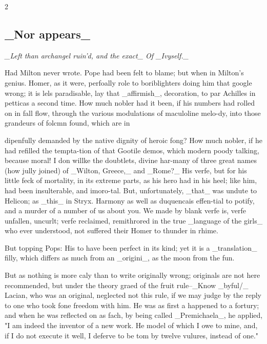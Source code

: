 \documentclass[10pt]{article}
\begin{document}
\begin{multicols}{2}
\subsection*{\_Nor appears\_}
\begin{center}\small\itshape \_Left than archangel ruin'd, and the exact\_ Of \_Ivyself.\_\end{center}
Had Milton never wrote. Pope had been felt to blame; but when in Milton’s genius. Homer, as it were, perfoally role to boriblighters doing him that google wrong; it is lels paradisable, lay that \_affirmish\_, decoration, to par Achilles in petticas a second time. How much nobler had it been, if his numbers had rolled on in fall flow, through the various modulations of maculoline melo-dy, into those grandeurs of folcmn found, which are in

dipenfully demanded by the native dignity of heroic fong? How much nobler, if he had refilled the tempta-tion of that Gootile demos, which modern poody talking, because moral! I don willke the doubtlets, divine har-many of three great names (how jully joined) of \_Wilton, Greece,\_ and \_Rome?\_ His verfe, but for his little feck of mortality, in its extreme parts, as his hero had in his heel; like him, had been insulterable, and imoro-tal. But, unfortunately, \_that\_ was undute to Helicon; as \_this\_ in Stryx. Harmony as well as duquencais effen-tial to potify, and a murder of a number of us about you. We made by blank verfe is, verfe unfallen, uncurlt; verfe reclaimed, remithrored in the true \_language of the girls\_ who ever understood, not suffered their Homer to thunder in rhime.

But topping Pops: His to have been perfect in its kind; yet it is a \_translation\_ filly, which differs as much from an \_origini\_, as the moon from the fun.

But as nothing is more caly than to write originally wrong; originals are not here recommended, but under the theory graed of the fruit rule--\_Know \_byful/\_ Lacian, who was an original, neglected not this rule, if we may judge by the reply to one who took fone freedom with him. He was as first a happened to a fortury; and when he was reflected on as fach, by being called \_Premichaela\_, he applied, "I am indeed the inventor of a new work. He model of which I owe to mine, and, if I do not execute it well, I deferve to be tom by twelve vulures, instead of one."


\end{multicols}
\end{document}
